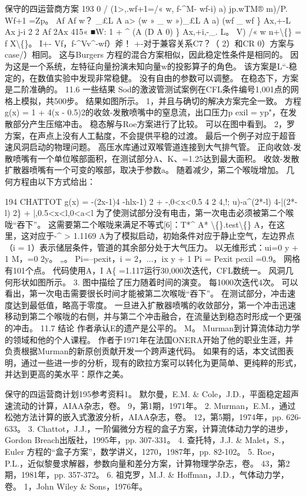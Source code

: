 \documentclass[UTF8,11pt,a4paper,openany,fontset=fandol]{ctexbook}
\begin{document}
保守的四运营商方案 193 0 / (1>,.wf+1=/« w, f-\textasciicircum{}M- wf-i) a) jp.wTM® m)/P. Wf+1 =Zp。 Af Af w？ \_£L A a> (w » \_ w »)\_£L A a) (wf \_ wf \} Ax,+-L Ax j-i 2 2 Af 2Ax 415« ■W: 1 + \textasciicircum{} (A (D A 0) \} Ax,+i,-\_. L。 V) /« w n+\textbackslash\{\} = f X\textbackslash\{\}。 I+- Vf，f-\textasciicircum{}Vv\textasciicircum{}-wf）斧！ +-对于兼容关系C7？（ 2）和CR 0）方案与case/）相同。 这与Burgers 方程的混合方案相似，因此稳定性条件是相同的。 因为这是一个系统，左特征向量扮演未知向量w的投影算子的角色。 该方案是L“-稳定的，在数值实验中发现非常稳健。 没有自由的参数可以调整。 在稳态下，方案是二阶准确的。 11.6 一些结果 Sod的激波管测试案例在CFL条件编号1,001点的网格上模拟，共500步。 结果如图所示。 1，并且与确切的解决方案完全一致。 方程g(x) = 1 + 4(x - 0.5)2的收敛-发散喷嘴中的窒息流，出口压力p exil = yp"，在发散部分产生压缩冲击。 稳态解与Roe方案进行了比较。 可以在图中看到。 2，罗方案，在声点上没有人工黏度，不会提供平稳的过渡。 最后一个例子对应于超音速风洞启动的物理问题。 高压水库通过双喉管道连接到大气排气管。 正向收敛-发散喷嘴有一个单位喉部面积，在测试部分A、K、=1.25达到最大面积。 收敛-发散扩散器喷嘴有一个可变的喉部，取决于参数a。 随着减少，第二个喉咙增加。 几何方程由以下方式给出：

194 CHATTOT g(x) = -(2x-1)4 -hlx-1) 2 + -,0<x<0.5 4 2 4,!; u)-a\textasciicircum{}(2*-l) 4-|(2*-l) 2\} + |,0.5<x<l,0<a<l 为了使测试部分没有电击，第一次电击必须被第二个喉咙“吞下”。 这需要第二个喉咙来满足不等式[6]：T*\textasciicircum{} A* \textbackslash\{\}.test\textbackslash\{\} A，在这里，这对应于-\textasciicircum{} > 1.1169 A为了模拟启动，初始条件对应于静止空气，左边界点（i = 1）表示储层条件，管道的其余部分处于大气压力。 以无维形式：ui=0 y + 1 M，=0 2y。 „。 Pi=--pexit，i = 2，...，ix y + 1 Pi = Pexit pexil =0.9。 网格有101个点。 代码使用A，I A\{ =1.117运行30,000次迭代，CFL数统一。 风洞几何形状如图所示。 3. 图中描绘了压力随着时间的演变。 每1000次迭代4次。 可以看出，第一次电击需要很长时间才能被第二次喉咙“吞下”。 在测试部分，冲击速度达到最低值，略高于零度。 一旦进入扩散器喷嘴的收敛部分，第一个冲击迅速移动到第二个喉咙的右侧，并与第二个冲击融合，在流量达到稳态时形成一个更强的冲击。 11.7 结论 作者承认E的遗产是公平的。 M。 Murman到计算流体动力学的领域和他的个人课程。 作者于1971年在法国ONERA开始了他的职业生涯，并负责根据Murman的新原创贡献开发一个跨声速代码。 如果有的话，本文试图表明，通过一些进一步的分析，现有的欧拉方案可以转化为更简单、更纯粹的形式，并达到更高的美水平：原作之美。

保守的四运营商计划195参考资料1。 默尔曼，E.M. \& Cole，J.D.，平面稳定超声速流动的计算，AIAA杂志，卷。 9，第1期，1971年。 2. Murman，E.M.，通过松弛方法计算的嵌入式激波分析，AIAA杂志，卷。 12，第5期，1974年，pp. 626-633。 3. Chattot，J.J.，一阶偏微分方程的盒子方案，计算流体动力学的进步，Gordon Breach出版社，1995年，pp. 307-331。 4. 查托特，J.J. \& Malet，S.，Euler 方程的“盒子方案”，数学讲义，1270，1987年，pp. 82-102。 5. Roe，P.L.，近似黎曼求解器，参数向量和差分方案，计算物理学杂志，卷。 43，第2期，1981年，pp. 357-372。 6. 祖克罗，M.J. \& Hoffman，J.D.，气体动力学，卷。 1，John Wiley \& Sons，1976年。
\end{document}

